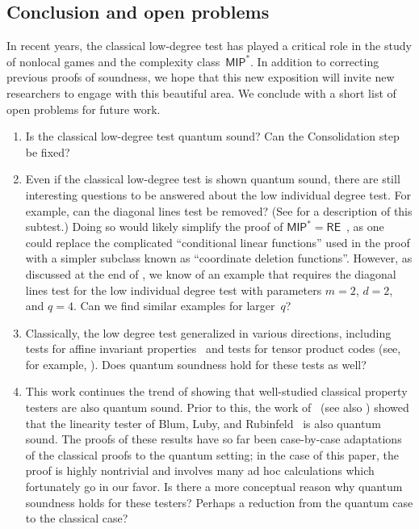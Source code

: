 \documentclass[11pt]{article}
\theoremstyle{definition}
\newcommand{\MIP}{\mathsf{MIP}}
\begin{document}
\subsection{Conclusion and open problems}

In recent years,
the classical low-degree test has played a critical role in the study of nonlocal games
and the complexity class~$\MIP^*$.
In addition to correcting previous proofs of soundness,
we hope that this new exposition
will invite new researchers to engage with this beautiful area.
We conclude with a short list of open problems for future work.

\begin{enumerate}
\item Is the classical low-degree test quantum sound? Can the Consolidation step be fixed?
\item Even if the classical low-degree test is shown quantum sound,
	there are still interesting questions to be answered about the low individual degree test.
	For example, can the diagonal lines test be removed? (See  for a description of this subtest.)
	Doing so would likely simplify the proof of $\MIP^* = \mathsf{RE}$~\cite{JNV+20},
	as one could replace the complicated ``conditional linear functions'' used in the proof
	with a simpler subclass known as ``coordinate deletion functions''.
	However, as discussed at the end of ,
	we know of an example that requires the diagonal lines test
	for the low individual degree test with parameters $m = 2$, $d = 2$, and $q = 4$.
	Can we find similar examples for larger~$q$?
\item Classically,  the low degree test
	generalized in various directions,
	including tests for affine invariant properties~\cite{KS08,Sud11}
	and tests for tensor product codes (see, for example, \cite{CMS17}).
	Does quantum soundness hold for these tests as well?
\item This work continues the trend of showing that well-studied classical property testers
	are also quantum sound.
	Prior to this, the work of~\cite{IV12} (see also \cite[Chapter 2]{Vid11}) showed that the linearity tester of Blum, Luby, and Rubinfeld~\cite{BLR93}
	is also quantum sound.
	The proofs of these results have so far been case-by-case adaptations of the classical proofs to the quantum setting;
	in the case of this paper, the proof is highly nontrivial
	and involves many ad hoc calculations which fortunately go in our favor.
	Is there a more conceptual reason why quantum soundness holds for these testers?
	Perhaps a reduction from the quantum case to the classical case?
\end{enumerate}
\end{document}
